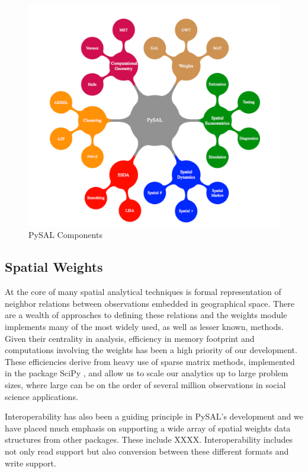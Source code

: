 \documentclass[11pt, titlepage]{article}
\begin{document}
\begin{figure}[ht]
\begin{center}
\includegraphics[width=\linewidth]{pysal_components.pdf}
\end{center}
\caption{PySAL Components}
\label{f:pysal}
\end{figure}   

\subsection{Spatial Weights}

At the core of many spatial analytical techniques is formal
representation of neighbor relations between observations embedded in
geographical space. There are a wealth of approaches to defining these
relations and the weights module implements many of the most widely
used, as well as lesser known, methods. Given their centrality in
analysis, efficiency in memory footprint and computations involving the
weights has been a high priority of our development. These efficiencies
derive from heavy use of sparse matrix methods, implemented in the
package SciPy \citep{Oliphant:2007ul}, and allow us to scale our
analytics up to large problem sizes, where large can be on the order of
several million observations in social science applications.

Interoperability has also been a guiding principle in PySAL's
development and we have placed much emphasis on supporting a wide array
of spatial weights data structures from other packages. These include
XXXX. Interoperability includes not only read support but also
conversion between these different formats and write support.
\end{document}
